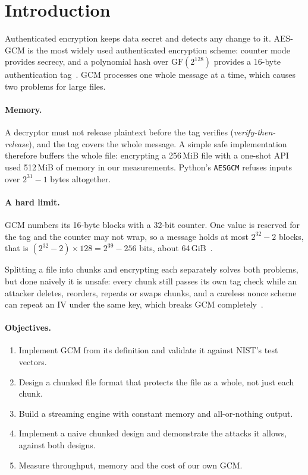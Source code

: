 \documentclass[11pt,a4paper]{article}
\newcommand{\GF}{\mathrm{GF}(2^{128})}
\begin{document}
\setcounter{tocdepth}{1}
\tableofcontents
\newpage

\section{Introduction}

Authenticated encryption keeps data secret and detects any change to it. AES-GCM is the most widely used authenticated encryption scheme: counter mode provides secrecy, and a polynomial hash over $\GF$ provides a 16-byte authentication tag~\cite{mv-spec,sp80038d}. GCM processes one whole message at a time, which causes two problems for large files.

\paragraph{Memory.} A decryptor must not release plaintext before the tag verifies (\emph{verify-then-release}), and the tag covers the whole message. A simple safe implementation therefore buffers the whole file: encrypting a 256\,MiB file with a one-shot API used 512\,MiB of memory in our measurements. Python's \texttt{AESGCM} refuses inputs over $2^{31}-1$ bytes altogether.

\paragraph{A hard limit.} GCM numbers its 16-byte blocks with a 32-bit counter. One value is reserved for the tag and the counter may not wrap, so a message holds at most $2^{32}-2$ blocks, that is $(2^{32}-2)\times 128 = 2^{39}-256$ bits, about 64\,GiB~\cite{sp80038d}.

Splitting a file into chunks and encrypting each separately solves both problems, but done naively it is unsafe: every chunk still passes its own tag check while an attacker deletes, reorders, repeats or swaps chunks, and a careless nonce scheme can repeat an IV under the same key, which breaks GCM completely~\cite{joux}.

\paragraph{Objectives.}
\begin{enumerate}
\item Implement GCM from its definition and validate it against NIST's test vectors.
\item Design a chunked file format that protects the file as a whole, not just each chunk.
\item Build a streaming engine with constant memory and all-or-nothing output.
\item Implement a naive chunked design and demonstrate the attacks it allows, against both designs.
\item Measure throughput, memory and the cost of our own GCM.
\end{enumerate}
\end{document}
